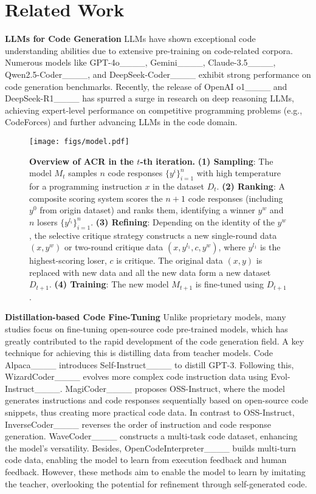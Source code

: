 \section{Related Work}
\textbf{LLMs for Code Generation} LLMs have shown exceptional code understanding abilities due to extensive pre-training on code-related corpora. Numerous models like GPT-4o____, Gemini____, Claude-3.5____, Qwen2.5-Coder____, and DeepSeek-Coder____ exhibit strong performance on code generation benchmarks. Recently, the release of OpenAI o1____ and DeepSeek-R1____ has spurred a surge in research on deep reasoning LLMs, achieving expert-level performance on competitive programming problems (e.g., CodeForces) and further advancing LLMs in the code domain.




\begin{figure*}[t]
    \centering
    \texttt{[image: figs/model.pdf]}
    \caption{\textbf{Overview of ACR in the $t$-th iteration.} \textbf{(1) Sampling}: The model $M_t$ samples $n$ code responses $\{y^{i}\}_{i=1}^n$ with high temperature for a programming instruction $x$ in the dataset $D_t$. \textbf{(2) Ranking}: A composite scoring system scores the $n+1$ code responses (including $y^0$ from origin dataset) and ranks them, identifying a winner $y^w$ and $n$ losers $\{y^{l_i}\}_{i=1}^n$. \textbf{(3) Refining}: Depending on the identity of the $y^w$, the selective critique strategy constructs a new single-round data $(x,y^w)$ or two-round critique data $(x, y^{l_1}, c, y^w)$, where $y^{l_1}$ is the highest-scoring loser, $c$ is critique. The original data $(x, y)$ is replaced with new data and all the new data form a new dataset $D_{t+1}$. \textbf{(4) Training}: The new model $M_{t+1}$ is fine-tuned using $D_{t+1}$.}
	\label{method:model}
\end{figure*}




\textbf{Distillation-based Code Fine-Tuning} 
Unlike proprietary models, many studies focus on fine-tuning open-source code pre-trained models, which has greatly contributed to the rapid development of the code generation field. A key technique for achieving this is distilling data from teacher models. Code Alpaca____ introduces Self-Instruct____ to distill GPT-3. Following this, WizardCoder____ evolves more complex code instruction data using Evol-Instruct____. MagiCoder____ proposes OSS-Instruct, where the model generates instructions and code responses sequentially based on open-source code snippets, thus creating more practical code data. In contrast to OSS-Instruct, InverseCoder____ reverses the order of instruction and code response generation. WaveCoder____ constructs a multi-task code dataset, enhancing the model's versatility. Besides, OpenCodeInterpreter____ builds multi-turn code data, enabling the model to learn from execution feedback and human feedback. However, these methods aim to enable the model to learn by imitating the teacher, overlooking the potential for refinement through self-generated code.




